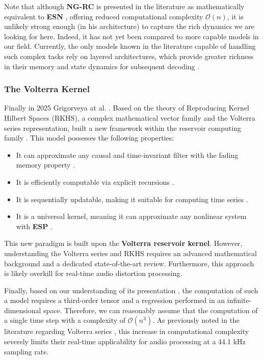 Note that although \textbf{NG-RC} is presented in the literature as mathematically equivalent to \textbf{ESN} \cite{Gauthier2021}, offering reduced computational complexity $\mathcal{O}(n)$, it is unlikely strong enough (in his architecture) to capture the rich dynamics we are looking for here. Indeed, it has not yet been compared to more capable models in our field. Currently, the only models known in the literature capable of handling such complex tasks rely on layered architectures, which provide greater richness in their memory and state dynamics for subsequent decoding \cite{goldmann2020deep, Keuninckx2017RealTime}.

\subsubsection{The Volterra Kernel}

Finally in 2025 Grigorveya at al. \cite{gonon2025reservoir}.
Based on the theory of Reproducing Kernel Hilbert Spaces (RKHS), a complex mathematical vector family and the Volterra series representation, built a new framework within the reservoir computing family \cite{gonon2025reservoir}. This model possesses the following properties:
\begin{itemize}
    \item It can approximate any causal and time-invariant filter with the fading memory property \cite{gonon2025reservoir}.
    \item It is efficiently computable via explicit recursions \cite{gonon2025reservoir}.
    \item It is sequentially updatable, making it suitable for computing time series \cite{gonon2025reservoir}.
    \item It is a universal kernel, meaning it can approximate any nonlinear system with \textbf{ESP} \cite{gonon2025reservoir}.
\end{itemize}

This new paradigm is built upon the \textbf{Volterra reservoir kernel}. However, understanding the Volterra series and RKHS requires an advanced mathematical background and a dedicated state-of-the-art review. Furthermore, this approach is likely overkill for real-time audio distortion processing. 

\vspace{0.5cm}

Finally, based on our understanding of its presentation \cite{grigoryeva_video}, the computation of such a model requires a third-order tensor and a regression performed in an infinite-dimensional space. Therefore, we can reasonably assume that the computation of a single time step with a complexity of $\mathcal{O}(n^3)$. As previously noted in the literature regarding Volterra series \cite{Keuninckx2017RealTime}, this increase in computational complexity severely limits their real-time applicability for audio processing at a 44.1 kHz sampling rate. 

